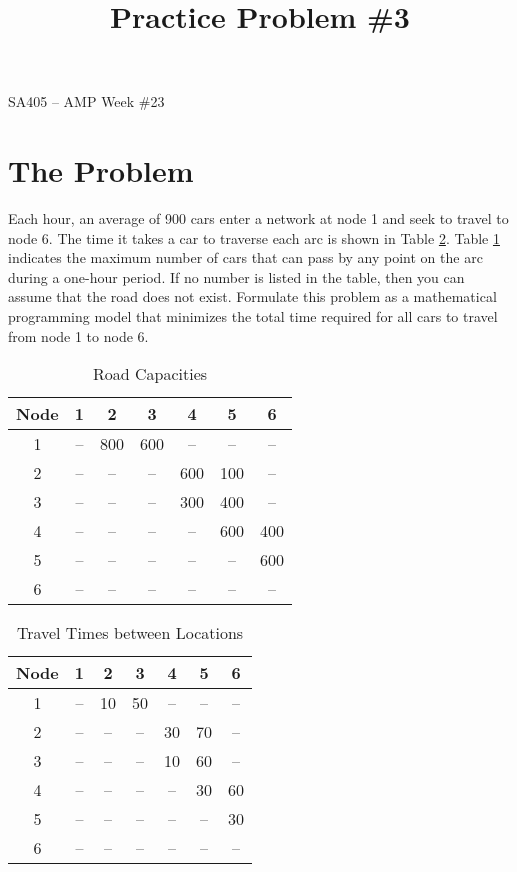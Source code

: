 \documentclass[11pt]{article}
\makeatletter
\theoremstyle{definition}
\renewcommand{\maketitle}{
  \noindent SA405 -- AMP \hfill Week \#23\\

  \begin{center}\Large{\textbf{\@title}}\end{center}
}
\makeatother
\begin{document}
  
\title{Practice Problem \#3}

\maketitle

\section{The Problem} \label{ProblemSection}

Each hour, an average of 900 cars enter a network at node 1 and seek to travel to node 6. The time it takes a car to traverse each arc is shown in Table \ref{tab:template2}. Table \ref{tab:template1} indicates the maximum number of cars that can pass by any point on the arc during a one-hour period. If no number is listed in the table, then you can assume that the road does not exist. Formulate this problem as a mathematical programming model that minimizes the total time required for all cars to travel from node 1 to node 6.

\begin{table}[h]
\centering
\begin{tabular}{|c|c|c|c|c|c|c|}
\hline
Node & 1 & 2 & 3 & 4 & 5 & 6\\ \hline
1 & -- & 800 & 600 & -- & -- & --\\ \hline
2 & -- & -- & -- & 600 & 100 & --\\ \hline
3 & -- & -- & -- & 300 & 400 & --\\ \hline
4 & -- & -- & -- & -- & 600 & 400\\ \hline
5 & -- & -- & -- & -- & -- & 600\\ \hline
6 & -- & -- & -- & -- & -- & --\\ \hline
\end{tabular}
\caption{Road Capacities}
\label{tab:template1}
\end{table}

\begin{table}[h]
\centering
\begin{tabular}{|c|c|c|c|c|c|c|}
\hline
Node & 1 & 2 & 3 & 4 & 5 & 6\\ \hline
1 & -- & 10 & 50 & -- & -- & --\\ \hline
2 & -- & -- & -- & 30 & 70 & --\\ \hline
3 & -- & -- & -- & 10 & 60 & --\\ \hline
4 & -- & -- & -- & -- & 30 & 60\\ \hline
5 & -- & -- & -- & -- & -- & 30\\ \hline
6 & -- & -- & -- & -- & -- & --\\ \hline
\end{tabular}
\caption{Travel Times between Locations}
\label{tab:template2}
\end{table}
\newpage
\end{document}
